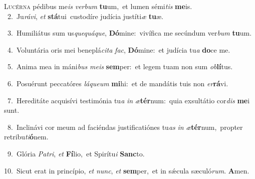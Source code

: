 \lettrine{\initial\textcolor{\initialcolor}{L}}{ucérna} pédibus me\textit{is} \textit{ver}\-\textit{bum} \textbf{tu}\-um,~\star et lumen sémi\textit{tis} \textbf{me}\-is.\\
{\numbfont\textcolor{\numbcolor}{~2.}}~Ju\-\textit{rá}\-\textit{vi}, \textit{et} \textbf{stá}\-tui~\star custodíre judícia justíti\textit{æ} \textbf{tu}\-æ.\par
{\numbfont\textcolor{\numbcolor}{~3.}}~Humiliátus sum us\-\textit{que}\-\textit{quá}\textit{que}, \textbf{Dó}\-mine:~\star vivífica me secúndum ver\textit{bum} \textbf{tu}\-um.\par
{\numbfont\textcolor{\numbcolor}{~4.}}~Voluntária oris mei beneplá\-\textit{ci}\-\textit{ta} \textit{fac}\-, \textbf{Dó}\-mine:~\star et judícia tu\textit{a} \textbf{do}\-ce me.\par
{\numbfont\textcolor{\numbcolor}{~5.}}~Anima mea in máni\textit{bus} \textit{me}\-\textit{is} \textbf{sem}\-per:~\star et legem tuam non sum \textit{ob}\-\textbf{lí}tus.\par
{\numbfont\textcolor{\numbcolor}{~6.}}~Posuérunt peccatóres \textit{lá}\-\textit{que}\textit{um} \textbf{mi}\-hi:~\star et de mandátis tuis non \textit{er}\-\textbf{rá}vi.\par
{\numbfont\textcolor{\numbcolor}{~7.}}~Hereditáte acquisívi testimónia tu\textit{a} \textit{in} \textit{æ}\-\textbf{tér}num:~\star quia exsultátio cor\textit{dis} \textbf{me}\-i sunt.\par
{\numbfont\textcolor{\numbcolor}{~8.}}~Inclinávi cor meum ad faciéndas justificatiónes tu\textit{as} \textit{in} \textit{æ}\-\textbf{tér}num,~\star propter retribu\-\textit{ti}\-\textbf{ó}nem.\par
{\numbfont\textcolor{\numbcolor}{~9.}}~Glória \textit{Pa}\-\textit{tri}, \textit{et} \textbf{Fí}\-lio,~\star et Spirítu\textit{i} \textbf{Sanc}\-to.\par
{\numbfont\textcolor{\numbcolor}{10.}}~Sicut erat in princípio, \textit{et} \textit{nunc}\-, \textit{et} \textbf{sem}\-per,~\star et in sǽcula sæculó\-\textit{rum}\-. \textbf{A}\-men.\par
